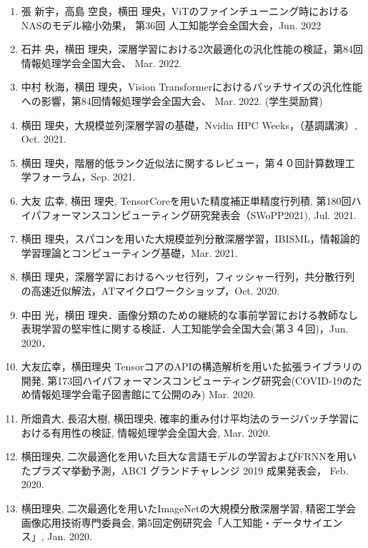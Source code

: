 \documentclass[margin,line]{cv}
\begin{document}
\begin{resume}
\begin{enumerate}
\item 張 新宇，高島 空良，横田 理央，ViTのファインチューニング時におけるNASのモデル縮小効果，
第36回 人工知能学会全国大会，Jun. 2022

\item 石井 央，横田 理央，深層学習における2次最適化の汎化性能の検証，第84回情報処理学会全国大会、 Mar. 2022.

\item 中村 秋海，横田 理央，Vision Transformerにおけるバッチサイズの汎化性能への影響，第84回情報処理学会全国大会、 Mar. 2022. (学生奨励賞)

\item 横田 理央，大規模並列深層学習の基礎，Nvidia HPC Weeks，（基調講演）, Oct. 2021.

\item 横田 理央，階層的低ランク近似法に関するレビュー，第４０回計算数理工学フォーラム，Sep. 2021.

\item 大友 広幸, 横田 理央, TensorCoreを用いた精度補正単精度行列積, 第180回ハイパフォーマンスコンピューティング研究発表会（SWoPP2021), Jul. 2021.

\item 横田 理央，スパコンを用いた大規模並列分散深層学習，IBISML，情報論的学習理論とコンピューティング基礎，Mar. 2021.

\item 横田 理央，深層学習におけるヘッセ行列，フィッシャー行列，共分散行列の高速近似解法，ATマイクロワークショップ，Oct. 2020.

\item 中田 光，横田 理央．画像分類のための継続的な事前学習における教師なし表現学習の堅牢性に関する検証．人工知能学会全国大会(第３４回)，Jun. 2020．

\item 大友広幸，横田理央 TensorコアのAPIの構造解析を用いた拡張ライブラリの開発, 第173回ハイパフォーマンスコンピューティング研究会(COVID-19のため情報処理学会電子図書館にて公開のみ) Mar. 2020.

\item 所畑貴大, 長沼大樹, 横田理央, 確率的重み付け平均法のラージバッチ学習における有用性の検証, 情報処理学会全国大会, Mar. 2020.

\item 横田理央, 二次最適化を用いた巨大な言語モデルの学習およびFRNNを用いたプラズマ挙動予測，ABCI グランドチャレンジ 2019 成果発表会， Feb. 2020.

\item 横田理央, 二次最適化を用いたImageNetの大規模分散深層学習, 精密工学会　画像応用技術専門委員会, 第5回定例研究会「人工知能・データサイエンス」, Jan. 2020.


\end{enumerate}
\end{resume}
\end{document}
